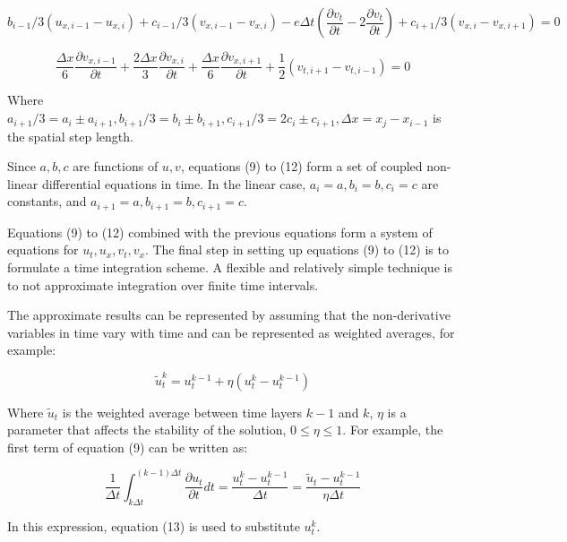 \documentclass{mcmthesis}  %
\begin{document}
\begin{appendices}
\begin{equation}
b_{i-1}/3(u_{x,i-1} - u_{x,i}) + c_{i-1}/3(v_{x,i-1} - v_{x,i}) - e\Delta t \left(\frac{\partial v_t}{\partial t} - 2\frac{\partial v_t}{\partial t}\right) + c_{i+1}/3(v_{x,i} - v_{x,i+1}) = 0
\end{equation}

\begin{equation}
\frac{\Delta x}{6} \frac{\partial v_{x,i-1}}{\partial t} + \frac{2\Delta x}{3} \frac{\partial v_{x,i}}{\partial t} + \frac{\Delta x}{6} \frac{\partial v_{x,i+1}}{\partial t} + \frac{1}{2}(v_{t,i+1} - v_{t,i-1}) = 0
\end{equation}

Where $a_{i+1}/3 = a_i \pm a_{i+1}, b_{i+1}/3 = b_i \pm b_{i+1}, c_{i+1}/3 = 2c_i \pm c_{i+1}, \Delta x = x_j - x_{i-1}$ is the spatial step length.

Since $a, b, c$ are functions of $u, v$, equations (9) to (12) form a set of coupled non-linear differential equations in time. In the linear case, $a_i = a, b_i = b, c_i = c$ are constants, and $a_{i+1} = a, b_{i+1} = b, c_{i+1} = c$.

Equations (9) to (12) combined with the previous equations form a system of equations for $u_t, u_x, v_t, v_x$. The final step in setting up equations (9) to (12) is to formulate a time integration scheme. A flexible and relatively simple technique is to not approximate integration over finite time intervals.

The approximate results can be represented by assuming that the non-derivative variables in time vary with time and can be represented as weighted averages, for example:

\begin{equation}
\tilde{u}_t^k = u_t^{k-1} + \eta(u_t^k - u_t^{k-1})
\end{equation}

Where $\tilde{u}_t$ is the weighted average between time layers $k-1$ and $k$, $\eta$ is a parameter that affects the stability of the solution, $0 \leq \eta \leq 1$. For example, the first term of equation (9) can be written as:

\begin{equation}
\frac{1}{\Delta t} \int_{k\Delta t}^{(k-1)\Delta t} \frac{\partial u_t}{\partial t} dt = \frac{u_t^k - u_t^{k-1}}{\Delta t} = \frac{\tilde{u}_t - u_t^{k-1}}{\eta \Delta t}
\end{equation}

In this expression, equation (13) is used to substitute $u_t^k$.


\end{appendices}
\end{document}
